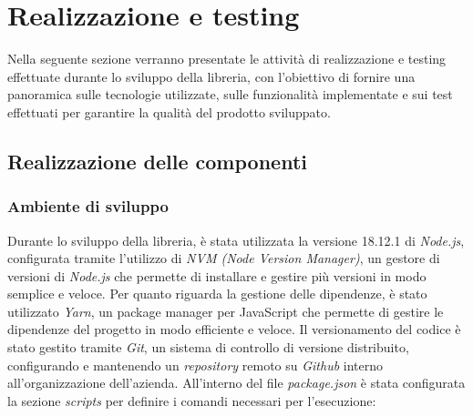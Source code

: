 \chapter{Realizzazione e testing}
\label{chap:realizzazione-testing}
Nella seguente sezione verranno presentate le attività di realizzazione e testing effettuate durante lo sviluppo della libreria, con l'obiettivo di fornire una panoramica
sulle tecnologie utilizzate, sulle funzionalità implementate e sui test effettuati per garantire la qualità del prodotto sviluppato.

\section{Realizzazione delle componenti}

\subsection{Ambiente di sviluppo}
Durante lo sviluppo della libreria, è stata utilizzata la versione 18.12.1 di \textit{Node.js}, configurata tramite l'utilizzo di \textit{NVM
    (Node Version Manager)}, un gestore di versioni di \textit{Node.js} che permette di installare e gestire più versioni in modo semplice
e veloce. \newline
Per quanto riguarda la gestione delle dipendenze, è stato utilizzato \textit{Yarn}, un package manager per JavaScript che permette di gestire
le dipendenze del progetto in modo efficiente e veloce. \newline
Il versionamento del codice è stato gestito tramite \textit{Git}, un sistema di controllo di versione distribuito, configurando e
mantenendo un \textit{\gls{repository}\glox} remoto su \textit{Github} interno all'organizzazione dell'azienda. \newline
All'interno del file \textit{package.json} è stata configurata la sezione \textit{scripts} per definire i comandi necessari per l'esecuzione:
